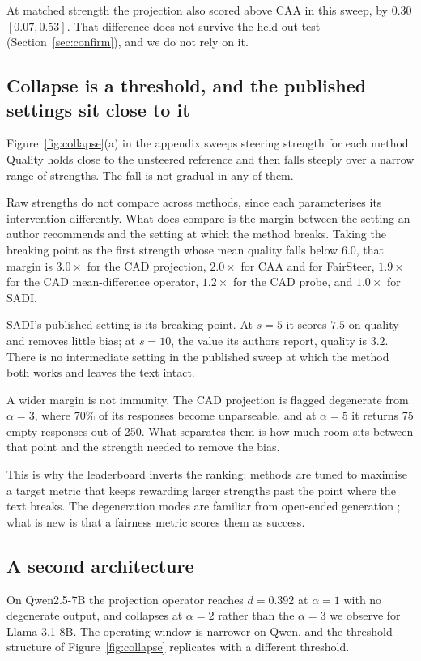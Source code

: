 At matched strength the projection also scored above CAA in this sweep, by $0.30$
$[0.07, 0.53]$. That difference does not survive the held-out test
(Section~\ref{sec:confirm}), and we do not rely on it.

\subsection{Collapse is a threshold, and the published settings sit close to it}

Figure~\ref{fig:collapse}(a) in the appendix sweeps steering strength for each method. Quality holds
close to the unsteered reference and then falls steeply over a narrow range of
strengths. The fall is not gradual in any of them.


Raw strengths do not compare across methods, since each parameterises its intervention
differently. What does compare is the margin between the setting an author recommends
and the setting at which the method breaks. Taking the breaking point as the first
strength whose mean quality falls below $6.0$, that margin is $3.0\times$ for the CAD
projection, $2.0\times$ for CAA and for FairSteer, $1.9\times$ for the CAD
mean-difference operator, $1.2\times$ for the CAD probe, and $1.0\times$ for SADI.

SADI's published setting is its breaking point. At $s{=}5$ it scores $7.5$ on quality
and removes little bias; at $s{=}10$, the value its authors report, quality is $3.2$.
There is no intermediate setting in the published sweep at which the method both works
and leaves the text intact.

A wider margin is not immunity. The CAD projection is flagged degenerate from
$\alpha{=}3$, where $70\%$ of its responses become unparseable, and at $\alpha{=}5$ it
returns 75 empty responses out of 250. What separates them is how much room
sits between that point and the strength needed to remove the bias.

This is why the leaderboard inverts the ranking: methods are tuned to maximise a target
metric that keeps rewarding larger strengths past the point where the text breaks. The
degeneration modes are familiar from open-ended generation \citep{welleck-etal-2019-neural};
what is new is that a fairness metric scores them as success.

\subsection{A second architecture}

On Qwen2.5-7B the projection operator reaches
$d{=}0.392$ at $\alpha{=}1$ with no degenerate output, and collapses at $\alpha{=}2$
rather than the $\alpha{=}3$ we observe for Llama-3.1-8B. The operating window is
narrower on Qwen, and the threshold structure of Figure~\ref{fig:collapse} replicates
with a different threshold.
